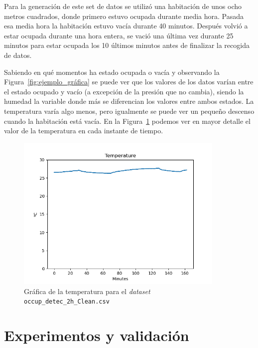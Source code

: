 \documentclass[a4paper, 12pt]{book}
\begin{document}
Para la generación de este set de datos se utilizó una habitación de unos ocho metros cuadrados, donde primero estuvo ocupada durante media hora. Pasada esa media hora la habitación estuvo vacía durante 40 minutos. Después volvió a estar ocupada durante una hora entera, se vació una última vez durante 25 minutos para estar ocupada los 10 últimos minutos antes de finalizar la recogida de datos.

Sabiendo en qué momentos ha estado ocupada o vacía y observando la Figura~\ref{fig:ejemplo_gráfica} se puede ver que los valores de los datos varían entre el estado ocupado y vacío (a excepción de la presión que no cambia), siendo la humedad la variable donde más se diferencian los valores entre ambos estados. La temperatura varía algo menos, pero igualmente se puede ver un pequeño descenso cuando la habitación está vacía. En la Figura~\ref{fig:graf_temp} podemos ver en mayor detalle el valor de la temperatura en cada instante de tiempo.

\begin{figure}[htb]
  \centering
  \includegraphics[width=10cm, keepaspectratio]{img/Temp_occup_detec_2h_original.png}
  \caption{Gráfica de la temperatura para el \textit{dataset} \texttt{occup\_detec\_2h\_Clean.csv}}\label{fig:graf_temp}
\end{figure}

\cleardoublepage


\chapter{Experimentos y validación}
\label{chap:experimentos}
\end{document}
